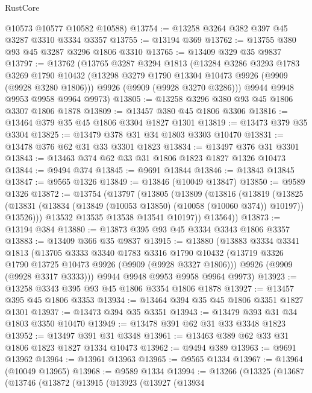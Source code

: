 \begin{lexlean}{RustCore}
\begin{coremodule}
      @10573
      @10577
      @10582
      @10588)
@13754 := @13258 @3264 @382 @397 @45 @3287 @3310 @3334 @3357
@13755 := @13194 @369
@13762 := @13755 @380 @93 @45 @3287 @3296 @1806 @3310
@13765 := @13409 @329 @35 @9837
@13797 := @13762
    (@13765
      @3287
      @3294
      @1813
      (@13284
        @3286
        @3293
        @1783
        @3269
        @1790
        @10432
        (@13298 @3279 @1790 @13304 @10473 @9926 (@9909 (@9928 @3280 @1806)))
        @9926
        (@9909 (@9928 @3270 @3286)))
      @9944
      @9948
      @9953
      @9958
      @9964
      @9973)
@13805 := @13258 @3296 @380 @93 @45 @1806 @3307 @1806 @1878
@13809 := @13457 @380 @45 @1806 @3306
@13816 := @13464 @379 @35 @45 @1806 @3304 @1827 @1301
@13819 := @13473 @379 @35 @3304
@13825 := @13479 @378 @31 @34 @1803 @3303 @10470
@13831 := @13478 @376 @62 @31 @33 @3301 @1823
@13834 := @13497 @376 @31 @3301
@13843 := @13463 @374 @62 @33 @31 @1806 @1823 @1827 @1326 @10473
@13844 := @9494 @374
@13845 := @9691 @13844
@13846 := @13843 @13845
@13847 := @9565 @1326
@13849 := @13846 (@10049 @13847)
@13850 := @9589 @1326
@13872 := @13754
    (@13797
      (@13805
        (@13809
          (@13816
            (@13819
              (@13825
                (@13831 (@13834 (@13849 (@10053 @13850) (@10058 (@10060 @374)) @10197)) @13526)))
            @13532
            @13535
            @13538
            @13541
            @10197))
        @13564))
@13873 := @13194 @384
@13880 := @13873 @395 @93 @45 @3334 @3343 @1806 @3357
@13883 := @13409 @366 @35 @9837
@13915 := @13880
    (@13883
      @3334
      @3341
      @1813
      (@13705
        @3333
        @3340
        @1783
        @3316
        @1790
        @10432
        (@13719 @3326 @1790 @13725 @10473 @9926 (@9909 (@9928 @3327 @1806)))
        @9926
        (@9909 (@9928 @3317 @3333)))
      @9944
      @9948
      @9953
      @9958
      @9964
      @9973)
@13923 := @13258 @3343 @395 @93 @45 @1806 @3354 @1806 @1878
@13927 := @13457 @395 @45 @1806 @3353
@13934 := @13464 @394 @35 @45 @1806 @3351 @1827 @1301
@13937 := @13473 @394 @35 @3351
@13943 := @13479 @393 @31 @34 @1803 @3350 @10470
@13949 := @13478 @391 @62 @31 @33 @3348 @1823
@13952 := @13497 @391 @31 @3348
@13961 := @13463 @389 @62 @33 @31 @1806 @1823 @1827 @1334 @10473
@13962 := @9494 @389
@13963 := @9691 @13962
@13964 := @13961 @13963
@13965 := @9565 @1334
@13967 := @13964 (@10049 @13965)
@13968 := @9589 @1334
@13994 := @13266
    (@13325
      (@13687
        (@13746
          (@13872
            (@13915
              (@13923
                (@13927
                  (@13934

\end{coremodule}
\end{lexlean}
